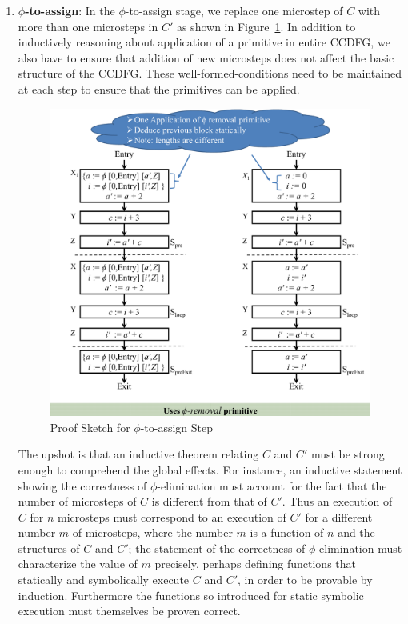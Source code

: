\begin{enumerate}
\item \textbf{$\phi$-to-assign}: In the $\phi$-to-assign stage, we replace one microstep of $C$ with more than one microsteps in $C'$
as shown in Figure~\ref{fig:proof-after-phi}. 
In addition to inductively reasoning about application of a primitive in entire CCDFG, we also have to ensure
that addition of new microsteps does not affect the basic structure of the CCDFG. These well-formed-conditions need to be maintained at each step to ensure that the primitives can be applied.



\begin{figure}[H]
\begin{center}
\includegraphics[width=5.5in]{fig-proposal/proof-after-phi}
\end{center}
\caption{Proof Sketch for $\phi$-to-assign Step}
\label{fig:proof-after-phi}
\end{figure}

The upshot is that an inductive theorem relating $C$ and $C'$ must be strong enough to 
comprehend the global effects. For instance, an inductive statement showing the
correctness of $\phi$-elimination must account for the fact
that the number of microsteps of $C$ is different from that
of $C'$.  Thus an execution of $C$ for $n$ microsteps must
correspond to an execution of $C'$ for a different number
$m$ of microsteps, where the number $m$ is a function of $n$
and the structures of $C$ and $C'$; the statement of the
correctness of $\phi$-elimination must characterize the
value of $m$ precisely, perhaps defining functions that
statically and symbolically execute $C$ and $C'$, in order
to be provable by induction.  Furthermore the functions so
introduced for static symbolic execution must themselves be
proven correct.




\end{enumerate}
